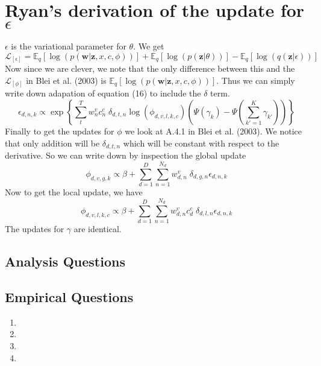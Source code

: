 \documentclass[11pt,a4paper]{article}
\begin{document}
\section*{Ryan's derivation of the update for $\epsilon$}
$\epsilon$ is the variational parameter for $\theta$. We get
$$
\mathcal{L}_{[\epsilon]} =  \mathbb{E}_q\left[ \log(p(\mathbf{w}|\mathbf{z},x,c,\phi)) \right] + \mathbb{E}_q\left[\log(p(\mathbf{z}|\theta))\right] - \mathbb{E}_q\left[\log(q(\mathbf{z}|\epsilon))\right] 
$$
Now since we are clever, we note that the only difference between this and the $\mathcal{L}_{[\phi]}$ in Blei et al. (2003) is $\mathbb{E}_q\left[ \log(p(\mathbf{w}|\mathbf{z},x,c,\phi)) \right]$. Thus we can simply write down adapation of equation (16) to include the $\delta$ term.
$$
\epsilon_{d,n,k} \propto \exp\left\{\sum_t^T w_n^v c_n^c \; \delta_{d,t,n} \log(\phi_{d,v,l,k,c})\left(\Psi(\gamma_k) - \Psi(\sum_{k'=1}^K \gamma_{k'} )\right)
\right\}
$$
Finally to get the updates for $\phi$ we look at A.4.1 in Blei et al. (2003). We notice that only addition will be $\delta_{d,t,n}$ which will be constant with respect to the derivative. So we can write down by inspection the global update
$$
\phi_{d,v,g,k} \propto \beta + \sum_{d=1}^D\sum_{n=1}^{N_d} w_{d,n}^v \; \delta_{d,g,n} \epsilon_{d,n,k}
$$
Now to get the local update, we have
$$
\phi_{d,v,l,k,c} \propto \beta +  \sum_{d=1}^D\sum_{n=1}^{N_d} w_{d,n}^v c_{d}^c\; \delta_{d,l,n} \epsilon_{d,n,k}
$$
The updates for $\gamma$ are identical. 



\subsection{Analysis Questions}

\setcounter{subsection}{2}
\subsection{Empirical Questions}
\begin{enumerate}
    \item 
    \item
    \item
    \item
\end{enumerate}
\end{document}
